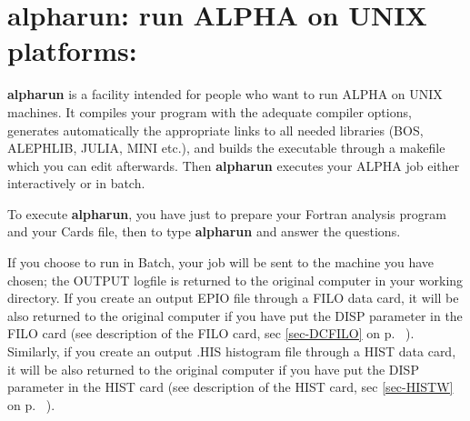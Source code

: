 \section{\label{sec-alphar}alpharun: run ALPHA on UNIX platforms:}
\par
{\bf alpharun} is a facility intended for people who want to run ALPHA on UNIX machines.
 It compiles your program with the adequate compiler options,
generates automatically the appropriate links to all needed libraries
 (BOS, ALEPHLIB, JULIA, MINI etc.), and builds the executable through a makefile which you can edit afterwards.
Then {\bf alpharun} executes your ALPHA job either interactively or in batch. 

\par
To execute {\bf alpharun}, you have just to prepare your Fortran analysis program and your Cards file, then to
type {\bf alpharun} and
answer the questions.

If you choose to run in Batch, your job will be sent to the machine you have chosen; the OUTPUT logfile is returned to the original
computer in your working directory. If you create an output EPIO file through a FILO data card,
 it will be also returned to the 
original computer if you have put the DISP parameter in the FILO card (see description of the FILO card, 
sec \ref{sec-DCFILO} on p. ~\pageref{sec-DCFILO}). 
Similarly, if you create an output .HIS histogram file through a HIST data card,
 it will be also returned to the
original computer if you have put the DISP parameter in the HIST card (see description of the HIST card,
sec \ref{sec-HISTW} on p. ~\pageref{sec-HISTW}).

